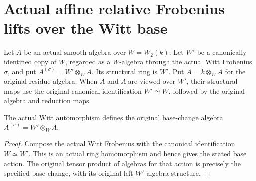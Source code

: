 \section{Actual affine relative Frobenius lifts over the Witt base}
\label{sec:witt-two-relative-lift}

Let $A$ be an actual smooth algebra over $W=W_2(k)$.
Let $W'$ be a canonically identified copy of $W$,
regarded as a $W$-algebra through the actual Witt
Frobenius $\sigma$, and put $A^{(\sigma)}=W'\otimes_W A$.
Its structural ring is $W'$. Put
$\overline A=k\otimes_W A$ for the original residue algebra.
When $A$ and $\overline A$ are viewed over $W'$,
their structural maps use the original canonical
identification $W'\simeq W$, followed by the
original algebra and reduction maps.

\begin{definition}
\label{def:witt-two-lifted-relative-twist}
\leanok
{}
The actual Witt automorphism defines the original
base-change algebra $A^{(\sigma)}=W'\otimes_W A$.
\end{definition}
\begin{proof}
Compose the actual Witt Frobenius with the
canonical identification $W\simeq W'$. This is
an actual ring homomorphism and hence gives the
stated base action. The original tensor product
of algebras for that action is precisely the
specified base change, with its original left
$W'$-algebra structure.
\end{proof}

